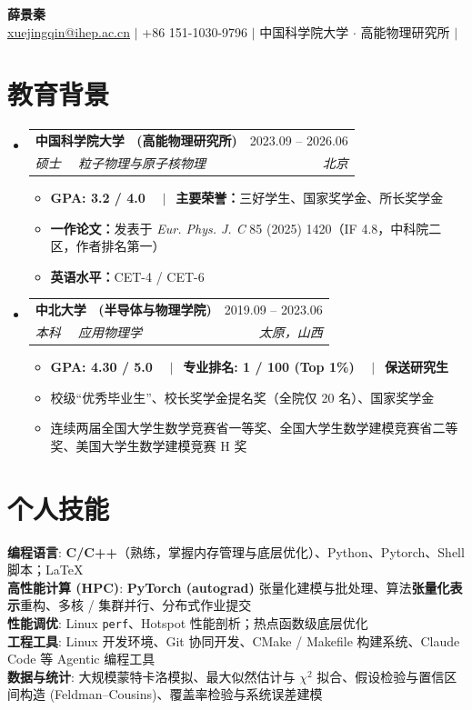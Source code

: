\documentclass[a4paper,11pt]{article}
\makeatletter
\newcommand{\resumeItem}[1]{
  \item\small{{#1 \vspace{-1pt}}}
}
\newcommand{\resumeEducationHeading}[4]{
  \vspace{-2pt}\item
    \begin{tabular*}{0.97\textwidth}[t]{l@{\extracolsep{\fill}}r}
      \textbf{#1} & #2 \\
      \textit{\small #3} & \textit{\small #4} \\
    \end{tabular*}\vspace{-5pt}
}
\newcommand{\resumeSubHeadingListStart}{\begin{itemize}[leftmargin=0.15in, label={}]}
\newcommand{\resumeSubHeadingListEnd}{\end{itemize}}
\newcommand{\resumeItemListStart}{\begin{itemize}[leftmargin=*, label={\small\textbullet}]}
\newcommand{\resumeItemListEnd}{\end{itemize}\vspace{-2pt}}
\makeatother
\begin{document}
\begin{center}
    \textbf{\Huge { 薛景秦}} \\ \vspace{8pt}
    \small
    \href{mailto:xuejingqin@ihep.ac.cn}{\underline{xuejingqin@ihep.ac.cn}} $|$
    +86 151-1030-9796 $|$
    中国科学院大学 $\cdot$ 高能物理研究所 $|$
    
\end{center}

\section{教育背景}
  \resumeSubHeadingListStart
    \resumeEducationHeading
      {中国科学院大学 \ (高能物理研究所)}{2023.09 -- 2026.06}
      {硕士 \ \textbar \ 粒子物理与原子核物理}{北京}
      \resumeItemListStart
        \resumeItem{\textbf{GPA: 3.2 / 4.0} \ \ $|\ \ $ \textbf{主要荣誉：}三好学生、国家奖学金、所长奖学金}
        \resumeItem{\textbf{一作论文：}发表于 \textit{Eur. Phys. J. C} 85 (2025) 1420（IF 4.8，中科院二区，作者排名第一）}
        \resumeItem{\textbf{英语水平：}CET-4 / CET-6}
      \resumeItemListEnd
    \resumeEducationHeading
      {中北大学 \ (半导体与物理学院)}{2019.09 -- 2023.06}
      {本科 \ \textbar \ 应用物理学}{太原，山西}
      \resumeItemListStart
        \resumeItem{\textbf{GPA: 4.30 / 5.0} \ \ $|\ \ $ \textbf{专业排名: 1 / 100 (Top 1\%)} \ \ $|\ \ $ \textbf{保送研究生}}
        \resumeItem{校级“优秀毕业生”、校长奖学金提名奖（全院仅 20 名）、国家奖学金}
        \resumeItem{连续两届全国大学生数学竞赛省一等奖、全国大学生数学建模竞赛省二等奖、美国大学生数学建模竞赛 H 奖}
      \resumeItemListEnd
  \resumeSubHeadingListEnd

\section{个人技能}
 \begin{itemize}[leftmargin=0.15in, label={}]
    \small{\item{
     \textbf{编程语言}{: \textbf{C/C++}（熟练，掌握内存管理与底层优化）、Python、Pytorch、Shell 脚本；LaTeX} \\
     \textbf{高性能计算 (HPC)}{: \textbf{PyTorch (autograd)} 张量化建模与批处理、算法\textbf{张量化表示}重构、多核 / 集群并行、分布式作业提交} \\
     \textbf{性能调优}{: Linux \texttt{perf}、Hotspot 性能剖析；热点函数级底层优化} \\
     \textbf{工程工具}{: Linux 开发环境、Git 协同开发、CMake / Makefile 构建系统、Claude Code 等 Agentic 编程工具} \\
     \textbf{数据与统计}{: 大规模蒙特卡洛模拟、最大似然估计与 $\chi^2$ 拟合、假设检验与置信区间构造 (Feldman--Cousins)、覆盖率检验与系统误差建模}
    }}
 \end{itemize}
\end{document}
